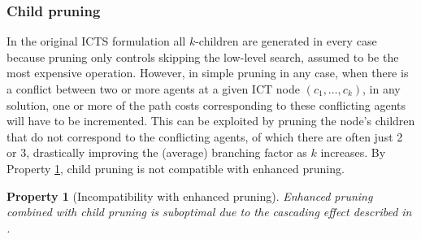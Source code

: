 \documentclass[english,10pt]{article}
\newtheorem{property}{Property}
\begin{document}
	\subsubsection{Child pruning}
	In the original ICTS formulation all $k$-children are generated in every case because pruning only controls skipping the low-level search, assumed to be the most expensive operation. However, in simple pruning in any case, when there is a conflict between two or more agents at a given ICT node $(c_1,\ldots,c_k)$, in any solution, one or more of the path costs corresponding to these conflicting agents will have to be incremented. This can be exploited by pruning the node's children that do not correspond to the conflicting agents, of which there are often just 2 or 3, drastically improving the (average) branching factor as $k$ increases. By Property \ref{property:ec-incompat}, child pruning is not compatible with enhanced pruning.
	\begin{property}[Incompatibility with enhanced pruning]
		Enhanced pruning combined with child pruning is suboptimal due to the \textit{cascading effect} described in \cite{sharon2011}.
		\label{property:ec-incompat}
	\end{property}
	
\end{document}
